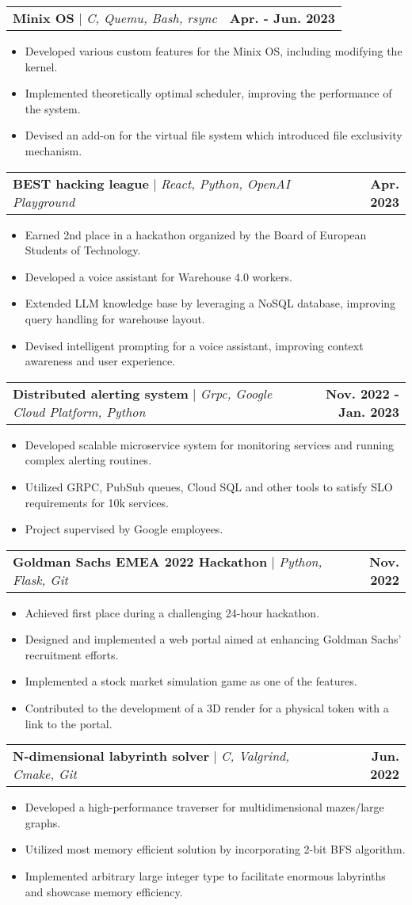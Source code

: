 \documentclass[letterpaper,11pt]{article}
\makeatletter
\newcommand{\resumeItem}[1]{
  \item\small{
    {#1 \vspace{-2pt}}
  }
}
\newcommand{\resumeProjectHeading}[2]{
    \vspace{-2pt}\item
    \begin{tabular*}{1.0\textwidth}{l@{\extracolsep{\fill}}r}
      \small#1 & \textbf{\small #2}\\
    \end{tabular*}\vspace{-7pt}
}
\newcommand{\resumeItemListStart}{\begin{itemize}}
\newcommand{\resumeItemListEnd}{\end{itemize}\vspace{-5pt}}
\makeatother
\begin{document}
\resumeProjectHeading
{\textbf{Minix OS} $|$ \emph{C, Quemu, Bash, rsync}}{Apr. - Jun. 2023}
\resumeItemListStart
\resumeItem{Developed various custom features for the Minix OS, including modifying the kernel.}
\resumeItem{Implemented theoretically optimal scheduler, improving the performance of the system.}
\resumeItem{Devised an add-on for the virtual file system which introduced file exclusivity mechanism.}
\resumeItemListEnd

\resumeProjectHeading
{\textbf{BEST hacking league} $|$ \emph{React, Python, OpenAI Playground}}{Apr. 2023}
\resumeItemListStart
\resumeItem{Earned 2nd place in a hackathon organized by the Board of European Students of Technology.}
\resumeItem{Developed a voice assistant for Warehouse 4.0 workers.}
\resumeItem{Extended LLM knowledge base by leveraging a NoSQL database, improving query handling for warehouse layout.}
\resumeItem{Devised intelligent prompting for a voice assistant, improving context awareness and user experience.}
\resumeItemListEnd

\resumeProjectHeading
{\textbf{Distributed alerting system} $|$ \emph{Grpc, Google Cloud Platform, Python}}{Nov. 2022 - Jan. 2023}
\resumeItemListStart
\resumeItem{Developed scalable microservice system for monitoring services and running complex alerting routines.}
\resumeItem{Utilized GRPC, PubSub queues, Cloud SQL and other tools to satisfy SLO requirements for 10k services.}
\resumeItem{Project supervised by Google employees.}
\resumeItemListEnd

\resumeProjectHeading
{\textbf{Goldman Sachs EMEA 2022 Hackathon} $|$ \emph{Python, Flask, Git}}{Nov. 2022}
\resumeItemListStart
\resumeItem{Achieved first place during a challenging 24-hour hackathon.}
\resumeItem{Designed and implemented a web portal aimed at enhancing Goldman Sachs' recruitment efforts.}
\resumeItem{Implemented a stock market simulation game as one of the features.}
\resumeItem{Contributed to the development of a 3D render for a physical token with a link to the portal.}
\resumeItemListEnd

\resumeProjectHeading
{\textbf{N-dimensional labyrinth solver} $|$ \emph{C, Valgrind, Cmake,  Git}}{Jun. 2022}
\resumeItemListStart
\resumeItem{Developed a high-performance traverser for multidimensional mazes/large graphs.}
\resumeItem{Utilized most memory efficient solution by incorporating 2-bit BFS algorithm.}
\resumeItem{Implemented arbitrary large integer type to facilitate enormous labyrinths and showcase memory efficiency.}
\resumeItemListEnd
\end{document}

